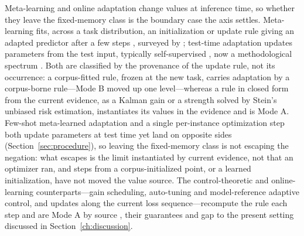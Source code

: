 Meta-learning and online adaptation change values at inference time, so whether they leave the fixed-memory class is the boundary case the axis settles. Meta-learning fits, across a task distribution, an initialization or update rule giving an adapted predictor after a few steps \citep{finn2017}, surveyed by \citet{hospedales2021}; test-time adaptation updates parameters from the test input, typically self-supervised \citep{sun2020}, now a methodological spectrum \citep{liang2024}. Both are classified by the provenance of the update rule, not its occurrence: a corpus-fitted rule, frozen at the new task, carries adaptation by a corpus-borne rule---Mode B moved up one level---whereas a rule in closed form from the current evidence, as a Kalman gain or a strength solved by Stein's unbiased risk estimation, instantiates its values in the evidence and is Mode A. Few-shot meta-learned adaptation and a single per-instance optimization step both update parameters at test time yet land on opposite sides (Section~\ref{sec:procedure}), so leaving the fixed-memory class is not escaping the negation: what escapes is the limit instantiated by current evidence, not that an optimizer ran, and steps from a corpus-initialized point, or a learned initialization, have not moved the value source. The control-theoretic and online-learning counterparts---gain scheduling, auto-tuning and model-reference adaptive control, and updates along the current loss sequence---recompute the rule each step and are Mode A by source \citep{shamma1990,astrom1995,hazan2016}, their guarantees and gap to the present setting discussed in Section~\ref{ch:discussion}.

